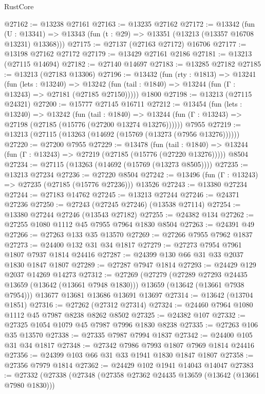 \begin{lexlean}{RustCore}
\begin{coremodule}
@27162 := @13238 @27161
@27163 := @13235 @27162
@27172 := @13342
    (fun (U : @13341) => @13343 (fun (t : @29) => @13351 (@13213 (@13357 @16708 @13231) @13368)))
@27175 := @27137 (@27163 @27172) @16706
@27177 := @13198 @27162 @27172
@27179 := @13429 @27161 @2186
@27181 := @13213 (@27115 @14694)
@27182 := @27140 @14697
@27183 := @13285 @27182
@27185 := @13213 (@27183 @13306)
@27196 := @13432
    (fun (rty : @1813) =>
    @13241
      (fun (lets : @13240) =>
      @13242 (fun (tail : @1840) => @13244 (fun (Γ : @13243) => @27181 (@27185 @27150)))))
    @1800
@27198 := @13213 (@27115 @24321)
@27200 := @15777 @27145 @16711
@27212 := @13454
    (fun (lets : @13240) =>
    @13242
      (fun (tail : @1840) =>
      @13244 (fun (Γ : @13243) => @27198 (@27185 (@15776 (@27200 @13274 @13276))))))
    @7955
@27219 := @13213 (@27115 (@13263 (@14692 (@15769 (@13273 (@7956 @13276))))))
@27220 := @27200 @7955
@27229 := @13478
    (fun (tail : @1840) => @13244 (fun (Γ : @13243) => @27219 (@27185 (@15776 (@27220 @13276)))))
    @8504
@27234 := @27115 (@13263 (@14692 (@15769 (@13273 @8505))))
@27235 := @13213 @27234
@27236 := @27220 @8504
@27242 := @13496 (fun (Γ : @13243) => @27235 (@27185 (@15776 @27236))) @13526
@27243 := @13380 @27234
@27244 := @27183 @14762
@27245 := @13213 @27244
@27246 := @24371 @27236
@27250 := @27243 (@27245 @27246) (@13538 @27114)
@27254 := @13380 @27244 @27246 (@13543 @27182)
@27255 := @24382 @134
@27262 := @27255 @1080 @1112 @45 @7955 @7964 @1830 @8504
@27263 := @24391 @49
@27266 := @27263 @133 @35 @13570
@27269 := @27266 @7955 @7962 @1837
@27273 := @24400 @132 @31 @34 @1817
@27279 := @27273 @7954 @7961 @1807 @7937 @1814 @24416
@27287 := @24399 @130 @66 @31 @33 @2037 @1830 @1847 @1807
@27289 := @27287 @7947 @1814
@27293 := @24429 @129 @2037 @14269 @14273
@27312 := @27269
    (@27279
      (@27289 @27293 @24435 @13659 (@13642 (@13661 @7948 @1830)))
      @13659
      (@13642 (@13661 @7938 @7954)))
    @13677
    @13681
    @13686
    @13691
    @13697
@27314 := @13642 (@13704 @1851)
@27316 := @27262 (@27312 @27314)
@27324 := @24460 @7964 @1080 @1112 @45 @7987 @8238 @8262 @8502
@27325 := @24382 @107
@27332 := @27325 @1054 @1079 @45 @7987 @7996 @1830 @8238
@27335 := @27263 @106 @35 @13570
@27338 := @27335 @7987 @7994 @1837
@27342 := @24400 @105 @31 @34 @1817
@27348 := @27342 @7986 @7993 @1807 @7969 @1814 @24416
@27356 := @24399 @103 @66 @31 @33 @1941 @1830 @1847 @1807
@27358 := @27356 @7979 @1814
@27362 := @24429 @102 @1941 @14043 @14047
@27383 := @27332
    (@27338
      (@27348
        (@27358 @27362 @24435 @13659 (@13642 (@13661 @7980 @1830)))

\end{coremodule}
\end{lexlean}
